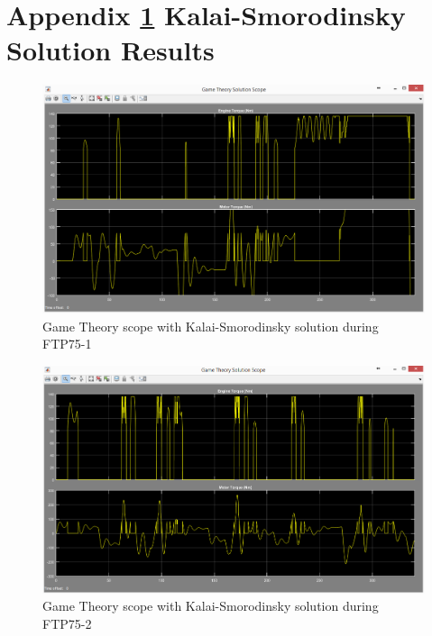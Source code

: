 \chapter{Appendix \ref{app:3} Kalai-Smorodinsky Solution Results}
\label{app:3}

\begin{figure}[h]
\centering
\includegraphics[scale=0.45]{figures/KalaiSmorodinsky/FTP75-1/gameTheory23Juni}
\caption{Game Theory scope with Kalai-Smorodinsky solution during FTP75-1}
\label{fig:gtks1}
\end{figure}

\begin{figure}[h]
\centering
\includegraphics[scale=0.45]{figures/KalaiSmorodinsky/FTP75-2/gameTheory23Juni}
\caption{Game Theory scope with Kalai-Smorodinsky solution during FTP75-2}
\label{fig:gtks2}
\end{figure}

